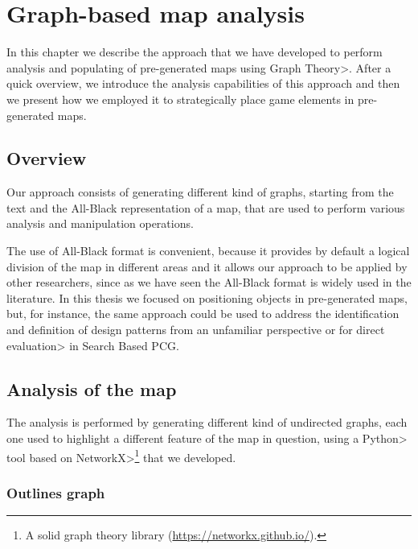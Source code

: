 \chapter{Graph-based map analysis}


In this chapter we describe the approach that we have developed to perform analysis and populating of pre-generated maps using \<Graph Theory>. After a quick overview, we introduce the analysis capabilities of this approach and then we present how we employed it to strategically place game elements in pre-generated maps.


\section{Overview}

Our approach consists of generating different kind of graphs, starting from the text and the All-Black representation of a map, that are used to perform various analysis and manipulation operations.

\par

The use of All-Black format is convenient, because it provides by default a logical division of the map in different areas and it allows our approach to be applied by other researchers, since as we have seen the All-Black format is widely used in the literature. In this thesis we focused on positioning objects in pre-generated maps, but, for instance, the same approach could be used to address the identification and definition of design patterns from an unfamiliar perspective or for \<direct evaluation> in Search Based PCG.


\section{Analysis of the map}

The analysis is performed by generating different kind of undirected graphs, each one used to highlight a different feature of the map in question, using a \<Python> tool based on \<NetworkX>\footnote{A solid graph theory library (\url{https://networkx.github.io/}).} that we developed.

\subsection{Outlines graph}

